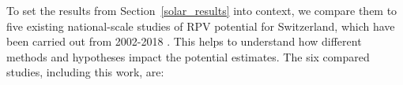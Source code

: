 To set the results from Section~\ref{solar_results} into context, we compare them to five existing national-scale studies of RPV potential for Switzerland, which have been carried out from 2002-2018 \cite{iea_potential_2002,assouline_quantifying_2017,assouline_large-scale_2018,klauser_solarpotentialanalyse_2016,buffat_scalable_2018}.
This helps to understand how different methods and hypotheses impact the potential estimates. 
The six compared studies, including this work, are:

